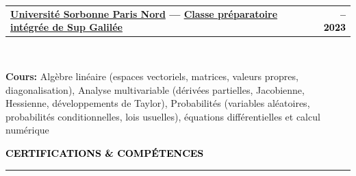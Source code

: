 \documentclass[10pt,english,french]{article}
\makeatletter
\newcommand{\certificateIcon}[1][black]{\textcolor{#1}{\faClipboard}}
\newlength{\mpwidth}
\newcommand{\cvsection}[1]{
    \vspace{4pt}
    \textbf{\fontsize{9pt}{10pt}\selectfont \textcolor{black}{#1}}
    \vspace{6pt}
    \hrule
    \vspace{6pt}
}
\newcommand{\cvtextnotab}[1]{
    \parbox{1\mpwidth}{#1}
}
\newcommand{\cvevent}[2]{
    \vspace{2pt}
    \parbox{\mpwidth}{
        \begin{tabular*}{1\mpwidth}{@{\extracolsep{\fill}} l r}
            \textcolor{black}{\textbf{\fontsize{11}{12}\selectfont #1}} & \textcolor{black}{\textbf{\fontsize{12}{12}\selectfont #2}} \\
        \end{tabular*}\\[-8pt] %
    }
}
\newcommand{\cvsubevent}[2]{
    \parbox{\mpwidth}{
        \begin{tabular*}{1\mpwidth}{@{\extracolsep{\fill}} l r}
            \textcolor{black}{\textit{\fontsize{10}{12}\selectfont #1}} & \textcolor{black}{\textit{\fontsize{10}{12}\selectfont #2}} \\
        \end{tabular*}\\[-8pt] %
    }
    \vspace{-10pt}
}
\makeatother
\begin{document}


\vspace{-10pt}
\noindent{\textcolor{middle_light_gray}{\rule{\mpwidth}{0.2pt}}}
\vspace{-15pt}

\cvevent{\href{https://www.univ-spn.fr}{Université Sorbonne Paris Nord} --- \href{https://www.sup-galilee.univ-paris13.fr/index.php/formation/cp2i/}{Classe préparatoire intégrée de \textbf{Sup Galilée}}}{\fontsize{11pt}{11pt}\selectfont 2021\hspace{5pt}--\hspace{5pt}2023}

\vspace{-10pt}
\cvtextnotab{
    \textbf{Cours\!:}
    Algèbre linéaire (espaces vectoriels, matrices, valeurs propres, diagonalisation),
    Analyse multivariable (dérivées partielles, Jacobienne, Hessienne, développements de Taylor),
    Probabilités (variables aléatoires, probabilités conditionnelles, lois usuelles),
    équations différentielles et calcul numérique
}



\vspace{-8pt}
\cvsection{\certificateIcon[black]\hspace{4pt}CERTIFICATIONS \& COMPÉTENCES}
\end{document}

